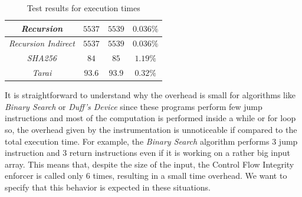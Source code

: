 \begin{table}
\begin{tabular}{|c|c|c|c|}
    \hline
    \textit{Recursion}                   & $5537$                        & $5539$                        & $0.036\%$              \\
    \hline
    \textit{Recursion Indirect}          & $5537$                        & $5539$                        & $0.036\%$              \\
    \hline
    \textit{SHA256}                      & $84$                          & $85$                          & $1.19\%$               \\
    \hline
    \textit{Tarai}                       & $93.6$                        & $93.9$                        & $0.32\%$               \\
    \hline
  \end{tabular}
  \caption{Test results for execution times}
  \label{tab:times}
\end{table}

It is straightforward to understand why the overhead is small for algorithms
like \textit{Binary Search} or \textit{Duff's Device} since these programs
perform few jump instructions and most of the computation is performed inside a
while or for loop so, the overhead given by the instrumentation is unnoticeable if
compared to the total execution time. For example, the \textit{Binary Search}
algorithm performs $3$ jump instruction and $3$ return instructions even if it
is working on a rather big input array. This means that, despite the size of the
input, the Control Flow Integrity enforcer is called only $6$ times, resulting
in a small time overhead. We want to specify that this behavior is expected in these
situations.

